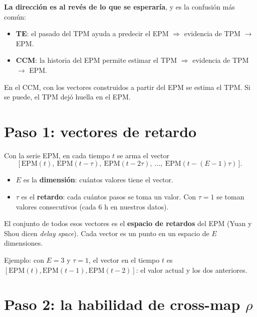 \documentclass[11pt,openany]{book}
\begin{document}
\textbf{La dirección es al revés de lo que se esperaría}, y es la confusión más común:
\begin{itemize}
\item \textbf{TE}: el pasado del TPM ayuda a predecir el EPM $\Rightarrow$ evidencia de TPM $\to$ EPM.
\item \textbf{CCM}: la historia del EPM permite estimar el TPM $\Rightarrow$ evidencia de TPM $\to$ EPM.
\end{itemize}
En el CCM, con los vectores construidos a partir del EPM se estima el TPM. Si se puede, el TPM dejó huella en el EPM.

\section{Paso 1: vectores de retardo}

\begin{nota}
Con la serie EPM, en cada tiempo $t$ se arma el vector
\[ \big[\,\text{EPM}(t),\ \text{EPM}(t-\tau),\ \text{EPM}(t-2\tau),\ \dots,\ \text{EPM}(t-(E-1)\tau)\,\big]. \]
\begin{itemize}
\item $E$ es la \textbf{dimensión}: cuántos valores tiene el vector.
\item $\tau$ es el \textbf{retardo}: cada cuántos pasos se toma un valor. Con $\tau = 1$ se toman valores consecutivos (cada 6 h en nuestros datos).
\end{itemize}
El conjunto de todos esos vectores es el \textbf{espacio de retardos} del EPM (Yuan y Shou dicen \emph{delay space}). Cada vector es un punto en un espacio de $E$ dimensiones.
\end{nota}

Ejemplo: con $E = 3$ y $\tau = 1$, el vector en el tiempo $t$ es $[\text{EPM}(t), \text{EPM}(t-1), \text{EPM}(t-2)]$: el valor actual y los dos anteriores.

\section{Paso 2: la habilidad de cross-map $\rho$}
\end{document}
